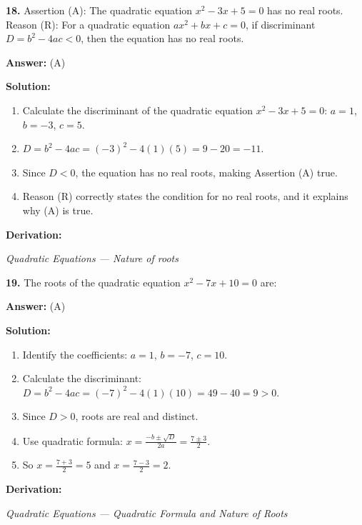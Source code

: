 \documentclass[12pt,a4paper]{exam}
\newcommand{\fitmath}[1]{%
  \sbox{\schmathbox}{$\displaystyle #1$}%
  \ifdim\wd\schmathbox>\linewidth
    \resizebox{\linewidth}{!}{\usebox{\schmathbox}}%
  \else
    \usebox{\schmathbox}%
  \fi}
\begin{document}
\begin{questions}
\question \textbf{18.} Assertion (A): The quadratic equation $x^2 - 3x + 5 = 0$ has no real roots.
Reason (R): For a quadratic equation $ax^2+bx+c=0$, if discriminant $D = b^2 - 4ac < 0$, then the equation has no real roots.

\textbf{Answer:}
(A)

\textbf{Solution:}
\begin{enumerate}
  \item Calculate the discriminant of the quadratic equation $x^2 - 3x + 5 = 0$: $a=1$, $b=-3$, $c=5$.
  \item $D = b^2 - 4ac = (-3)^2 - 4(1)(5) = 9 - 20 = -11$.
  \item Since $D < 0$, the equation has no real roots, making Assertion (A) true.
  \item Reason (R) correctly states the condition for no real roots, and it explains why (A) is true.
\end{enumerate}
\textbf{Derivation:}
\begin{center}
\fitmath{D = (-3)^2 - 4(1)(5) = 9 - 20 = -11 < 0}
\end{center}
\hfill \textit{Quadratic Equations — Nature of roots}
\vspace{0.3cm}

\question \textbf{19.} The roots of the quadratic equation $x^2 - 7x + 10 = 0$ are:

\textbf{Answer:}
(A)

\textbf{Solution:}
\begin{enumerate}
  \item Identify the coefficients: $a = 1$, $b = -7$, $c = 10$.
  \item Calculate the discriminant: $D = b^2 - 4ac = (-7)^2 - 4(1)(10) = 49 - 40 = 9 > 0$.
  \item Since $D > 0$, roots are real and distinct.
  \item Use quadratic formula: $x = \frac{-b \pm \sqrt{D}}{2a} = \frac{7 \pm 3}{2}$.
  \item So $x = \frac{7+3}{2} = 5$ and $x = \frac{7-3}{2} = 2$.
\end{enumerate}
\textbf{Derivation:}
\begin{center}
\fitmath{\begin{aligned}
x = \frac{7 \pm \sqrt{49 - 40}}{2} = \frac{7 \pm 3}{2} \\
\Rightarrow x = 5, 2
\end{aligned}}
\end{center}
\hfill \textit{Quadratic Equations — Quadratic Formula and Nature of Roots}
\vspace{0.3cm}


\end{questions}
\end{document}
